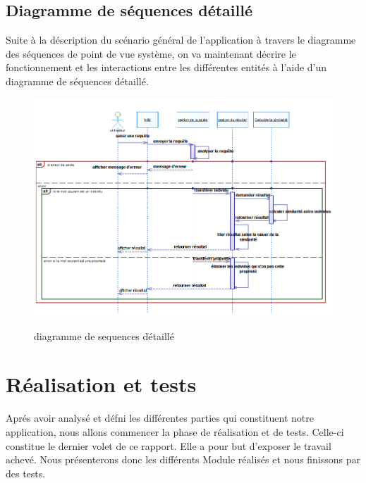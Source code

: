         \subsection{Diagramme de séquences détaillé}
        Suite à la déscription du  scénario général de l'application à travers le diagramme des séquences de point de vue système, on va maintenant décrire le fonctionnement et les interactions entre les différentes entités à l'aide d'un diagramme de séquences détaillé.\\
            \begin{figure}[H]
                    \centering
                    \includegraphics[width=17cm]{diag_sequence_detaille}\\
                    \caption{diagramme de sequences détaillé}\label{diagramme de sequence détaillé}
        \end{figure}
\section{Réalisation et tests}
    Aprés avoir analysé et défni les différentes parties qui constituent notre
    application, nous allons commencer la phase de réalisation et de tests. Celle-ci
    constitue le dernier volet de ce rapport. Elle a pour but d'exposer le travail
    achevé. Nous présenterons donc les différents Module réalisés et nous finissons par des tests.\\
